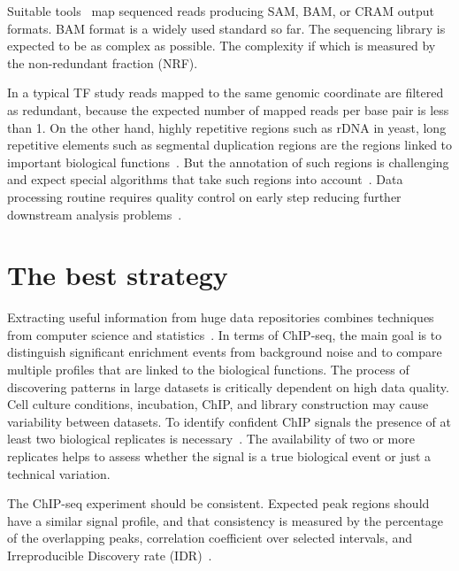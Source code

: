 Suitable tools~\cite{langmead2009ultrafast, li2009fast, kim2019graph} map sequenced reads producing  SAM, BAM, or CRAM output formats. 
BAM format is a widely used standard so far.
The sequencing library is expected to be as complex as possible. 
The complexity if which is measured by the non-redundant fraction (NRF).

In a typical TF study reads mapped to the same genomic coordinate are filtered as redundant, because the expected number of mapped reads per base pair is less than 1. 
On the other hand, highly repetitive regions such as rDNA in yeast, long repetitive elements such as segmental duplication regions are the regions linked to important biological functions~\cite{nakato2017recent}. But the annotation of such regions is challenging and expect special algorithms that take such regions into account~\cite{chung2011discovering}.
Data processing routine requires quality control on early step reducing further downstream analysis problems~\cite{ewels2016multiqc}.

\section{The best strategy}
\label{strategy}

Extracting useful information from huge data repositories combines techniques from computer science and statistics~\cite{friedman2001elements}. 
In terms of ChIP-seq, the main goal is to distinguish significant enrichment events from background noise and to compare multiple profiles that are linked to the biological functions. 
The process of discovering patterns in large datasets is critically dependent on high data quality. 
Cell culture conditions, incubation, ChIP, and library construction may cause variability between datasets. 
To identify confident ChIP signals the presence of at least two biological replicates is necessary~\cite{kidder2011chip}. 
The availability of two or more replicates helps to assess whether the signal is a true biological event or just a technical variation. 

The ChIP-seq experiment should be consistent. 
Expected peak regions should have a similar signal profile, and that consistency is measured by the percentage of the overlapping peaks, correlation coefficient over selected intervals, and Irreproducible Discovery rate (IDR)~\cite{shin2013computational}.


